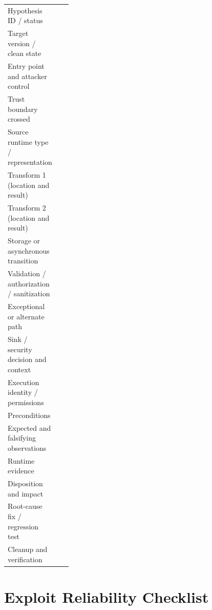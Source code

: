 \documentclass[11pt]{article}
\begin{document}
\begin{tabularx}{\linewidth}{@{}L{0.25\linewidth}Y@{}}
\toprule
Hypothesis ID / status & \\
Target version / clean state & \\
Entry point and attacker control & \\
Trust boundary crossed & \\
Source runtime type / representation & \\
Transform 1 (location and result) & \\
Transform 2 (location and result) & \\
Storage or asynchronous transition & \\
Validation / authorization / sanitization & \\
Exceptional or alternate path & \\
Sink / security decision and context & \\
Execution identity / permissions & \\
Preconditions & \\
Expected and falsifying observations & \\
Runtime evidence & \\
Disposition and impact & \\
Root-cause fix / regression test & \\
Cleanup and verification & \\
\bottomrule
\end{tabularx}

\section{Exploit Reliability Checklist}
\end{document}
